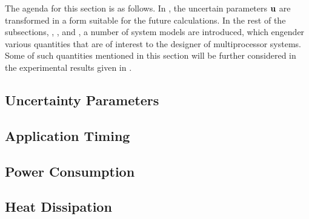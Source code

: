 The agenda for this section is as follows. In , the
uncertain parameters $\mathbf{u}$ are transformed in a form suitable for the future
calculations. In the rest of the subsections, ,
, and , a number of system models
are introduced, which engender various quantities that are of interest to the
designer of multiprocessor systems. Some of such quantities mentioned in this
section will be further considered in the experimental results given in
.

\subsection{Uncertainty Parameters} 


\subsection{Application Timing} 


\subsection{Power Consumption} 


\subsection{Heat Dissipation} 

